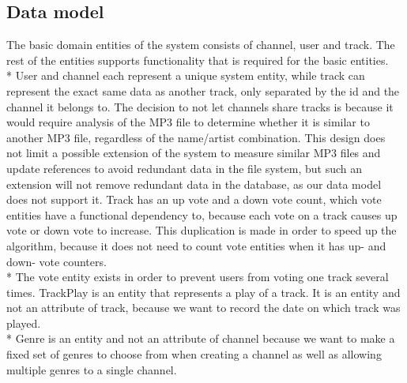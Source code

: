 \documentclass[a4paper,11pt,report]{article}
\begin{document}
\subsection{Data model}
The basic domain entities of the system consists of channel, user and track. The rest of the entities supports functionality that is required for the basic entities. \\*
User and channel each represent a unique system entity, while track can represent the exact same data as another track, only separated by the id and the channel it belongs to.
The decision to not let channels share tracks is because it would require analysis of the MP3 file to determine whether it is similar to another MP3 file, regardless of the name/artist combination.
This design does not limit a possible extension of the system to measure similar MP3 files and update references to avoid redundant data in the file system, but such an extension will not remove redundant data in the database, as our data model does not support it. 
Track has an up vote and a down vote count, which vote entities have a functional dependency to, because each vote on a track causes up vote or down vote to increase. This duplication is made in order to speed up the algorithm, because it does not need to count vote entities when it has up- and down- vote counters. \\*
The vote entity exists in order to prevent users from voting one track several times.
TrackPlay is an entity that represents a play of a track. It is an entity and not an attribute of track, because we want to record the date on which track was played. \\*
Genre is an entity and not an attribute of channel because we want to make a fixed set of genres to choose from when creating a channel as well as allowing multiple genres to a single channel.
\end{document}
